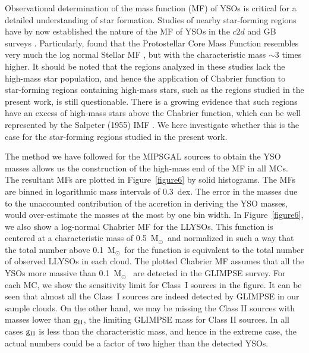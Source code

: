 \documentclass[iop]{emulateapj}
\newcommand{\msun}{M$_{\odot}$}
\begin{document}
Observational determination of the mass function (MF) of YSOs is 
critical for a detailed understanding of star formation. Studies of nearby 
star-forming regions have by now established the nature of the MF of YSOs 
in the $c2d$ and GB surveys \citep{enoch+06,andre+10}. Particularly, 
\citet{andre+10} found that the Protostellar Core Mass Function resembles 
very much the log normal Stellar MF \citep{chabrier03}, but with the 
characteristic mass $\sim$3 times higher.
It should be noted that the regions analyzed in these 
studies lack the high-mass star population, and hence the application of 
Chabrier function to star-forming regions containing high-mass stars, such
as the regions studied in the present work, is still questionable.
There is a growing evidence that such regions have an excess of high-mass 
stars above the Chabrier function, which can be well represented by the
Salpeter (1955) IMF \citep[see the review by][]{bastian+10}. We here 
investigate whether this is the case for the star-forming regions 
studied in the present work.

The method we have followed for the MIPSGAL sources to obtain the YSO 
masses allows us the construction of the high-mass end of the MF in all MCs.
The resultant MFs are plotted in Figure~\ref{figure6} by solid histograms.
The MFs are binned in logarithmic mass intervals of 0.3~dex. 
The error in the masses due to the unaccounted contribution of the 
accretion in deriving the YSO masses, would over-estimate
the masses at the most by one bin width.
In Figure~\ref{figure6}, we also show a log-normal Chabrier MF for the LLYSOs.
This function is centered at a characteristic mass of 0.5~\msun\ 
and normalized in such a way that the total number above 0.1~\msun\ for the
function is equivalent to the total number of observed LLYSOs in each cloud.
The plotted Chabrier MF assumes that all the YSOs more massive 
than 0.1~\msun~ are detected in the GLIMPSE survey. For each MC, we 
show the sensitivity limit for Class~I sources in the figure. It can be seen 
that almost all the Class~I sources are indeed detected by GLIMPSE in our 
sample clouds. On the other hand, we may be missing the Class II sources 
with masses lower than $\rm g_{\rm II}$, the limiting GLIMPSE mass for Class II 
sources. In all cases $\rm g_{\rm II}$ is less than the characteristic mass, and 
hence in the extreme case, the actual numbers could be a factor of two higher
than the detected YSOs.
\end{document}
